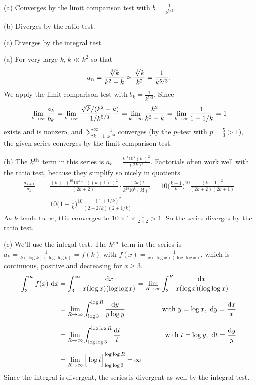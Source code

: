 
\begin{answer}
(a) Converges by the limit comparison test with $b=\frac{1}{k^{5/3}}$.

\noindent (b)
Diverges by the ratio test.

\noindent (c)
Diverges by the integral test.
\end{answer}



\begin{solution} (a)
For very large $k$, $k\ll k^2$ so that
\[a_n=\frac{\root{3}\of{k}}{k^2-k}\approx \frac{\root{3}\of{k}}{k^2}
                                                           =\frac{1}{k^{5/3}}.\]
We apply the limit comparison test with $b_k=\frac{1}{k^{5/3}}$.
Since
\begin{align*}
\lim_{k\rightarrow\infty}\frac{a_k}{b_k}
=\lim_{k\rightarrow\infty}\frac{\root{3}\of{k}/(k^2-k)}{1/k^{5/3}}
=\lim_{k\rightarrow\infty}\frac{k^2}{k^2-k}
=\lim_{k\rightarrow\infty}\frac{1}{1-1/k}
=1
\end{align*}
exists and is nonzero, and $\sum\limits_{k=1}^\infty\frac{1}{k^{5/3}}$ converges (by the $p$--test
with  $p=\frac{5}{3}>1$), the given series converges by the limit comparison test.

\noindent (b)
The $k^{\rm th}$ term in this series is
$a_k= \frac{k^{10}10^k(k!)^2}{(2k)!}$. Factorials often work well with the ratio test, because they simplify so nicely in quotients.
\begin{align*}
\frac{a_{k+1}}{a_k}
&=\frac{(k+1)^{10}10^{k+1}((k+1)!)^2}{(2k+2)!}\cdot\frac{(2k)!}{k^{10}10^k(k!)^2}
=10\Big(\frac{k+1}{k}\Big)^{10}\frac{(k+1)^2}{(2k+2)(2k+1)}\\
&=10\Big(1+\frac{1}{k}\Big)^{10}\frac{(1+1/k)^2}{(2+2/k)(2+1/k)}
\end{align*}
As $k$ tends to $\infty$, this converges to
$10\times 1\times\frac{1}{2\times 2}>1$. So the series diverges by the
ratio test.


\noindent (c)
We'll use the integal test. The $k^{\rm th}$ term in the series
is $a_k=\frac{1}{k(\log k) (\log\log k)}=f(k)$ with
$f(x)=\frac{1}{x(\log x) (\log\log x)}$, which is continuous, positive and
decreasing for $x\ge 3$.
\begin{alignat*}{3}
\int_3^\infty f(x)\ \dee{x}
&= \int_3^\infty \frac{\dee{x}}{x(\log x) (\log\log x)}
   =\lim_{R\rightarrow\infty} \int_3^R \frac{\dee{x}}{x(\log x) (\log\log x)}
    \hidewidth\\[0.1in]
&=\lim_{R\rightarrow\infty} \int_{\log 3}^{\log R} \frac{\dee{y}}{y\log y}
    &\qquad\text{with }y=\log x,\ \dee{y}=\frac{\dee{x}}{x} \\[0.1in]
&= \lim_{R\rightarrow\infty}\int_{\log \log 3}^{\log \log R} \frac{\dee{t}}{t}
    & \qquad\text{with }t=\log y,\ \dee{t}=\frac{\dee{y}}{y} \\[0.1in]
&=\lim_{R \to \infty}\Big[\log t\Big]_{\log \log 3}^{\log\log R}=\infty
\end{alignat*}
Since the integral is divergent, the series is divergent as well by the integral test.
\end{solution}

